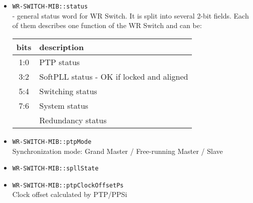 \begin{itemize}[leftmargin=0pt]
	\item [] \texttt{WR-SWITCH-MIB::status}\\ - general status word for WR Switch.
		It is split into several 2-bit fields. Each of them describes one
		function of the WR Switch and can be:
		\vspace{12pt}
		\begin{tabular}{|c|l|}
			\hline
			bits & description\\
			\hline \hline
			1:0 & PTP status\\
			3:2 & SoftPLL status - OK if locked and aligned\\
			5:4 & Switching status\\
			7:6 & System status\\
			 & Redundancy status\\
			\hline
		\end{tabular}

	\item [] \texttt{WR-SWITCH-MIB::ptpMode}\\
		Synchronization mode: Grand Master / Free-running Master / Slave
	\item [] \texttt{WR-SWITCH-MIB::spllState}\\

	\item [] \texttt{WR-SWITCH-MIB::ptpClockOffsetPs}\\
		Clock offset calculated by PTP/PPSi


\end{itemize}
